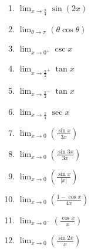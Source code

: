 \documentclass[12pt]{article}
\newif\ifans
\begin{document}
\begin{enumerate}

\item  $\displaystyle \lim_{x\rightarrow \frac{\pi}{4}} \sin{(2x)}$ 

\ifans{\fbox{1}} \fi

\item $\displaystyle \lim_{\theta \rightarrow \pi}{(\theta \cos{\theta})}$

\ifans{\fbox{$-\pi$}} \fi

\item  $\displaystyle \lim_{x\rightarrow 0^+} \csc x$ 

\ifans{\fbox{$+\infty$}} \fi

\item  $\displaystyle \lim_{x\rightarrow \frac{\pi}{2}^+} \tan x$ 

\ifans{\fbox{$-\infty$}} \fi

\item  $\displaystyle \lim_{x\rightarrow \frac{\pi}{2}^-} \tan x$ 

\ifans{\fbox{$+\infty$}} \fi

\item $\displaystyle \lim_{x \rightarrow \frac{\pi}{4}}{\sec{x}}$

\ifans{\fbox{$\sqrt{2}$}} \fi

\item $\displaystyle \lim_{x\rightarrow 0}{\left(\frac{\sin{x}}{3x}\right)}$ 

\ifans{\fbox{$\displaystyle \frac{1}{3}$}} \fi

\item $\displaystyle \lim_{x\rightarrow 0}{\left(\frac{\sin{3x}}{3x}\right)}$ 

\ifans{\fbox{$\displaystyle 1$}} \fi

\item $\displaystyle \lim_{x\rightarrow 0}{\left(\frac{\sin{x}}{|x|}\right)}$

\ifans{\fbox{DNE}} \fi

\item $\displaystyle \lim_{x\rightarrow 0}{\left(\frac{1-\cos{x}}{4x}\right)}$

\ifans{\fbox{$0$}} \fi

\item $\displaystyle \lim_{x\rightarrow 0^-}{\left(\frac{\cos x}{x}\right)}$ 

\ifans{\fbox{$-\infty$}} \fi

\item $\displaystyle \lim_{x\rightarrow 0}{\left(\frac{\sin 2x}{x}\right)}$


\end{enumerate}
\end{document}
